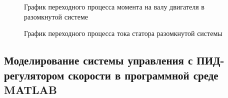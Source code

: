        \begin{figure}[h!]
            \caption{График переходного процесса момента на валу двигателя в
                разомкнутой системе}
            \label{fig:open-loop-te}
        \end{figure}

        \begin{figure}[h!]
            \caption{График переходного процесса тока статора 
                разомкнутой системы}
            \label{fig:open-loop-is_a}
        \end{figure}

        \clearpage
    
    \subsection{Моделирование системы управления с ПИД-регулятором скорости в
        программной среде MATLAB}

